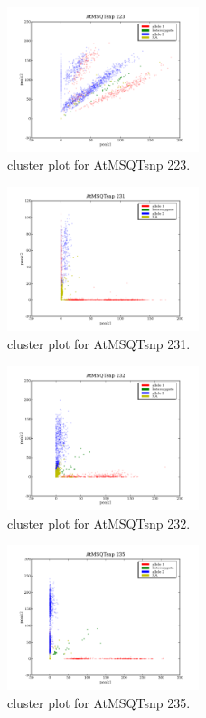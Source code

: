 \begin{figure}[H]
\includegraphics[width=0.5\textwidth]{figures/cluster_plot_AtMSQTsnp_223.png}
\caption{cluster plot for AtMSQTsnp 223.} \label{flAtMSQTsnp223}
\end{figure}
\begin{figure}[H]
\includegraphics[width=0.5\textwidth]{figures/cluster_plot_AtMSQTsnp_231.png}
\caption{cluster plot for AtMSQTsnp 231.} \label{flAtMSQTsnp231}
\end{figure}
\begin{figure}[H]
\includegraphics[width=0.5\textwidth]{figures/cluster_plot_AtMSQTsnp_232.png}
\caption{cluster plot for AtMSQTsnp 232.} \label{flAtMSQTsnp232}
\end{figure}
\begin{figure}[H]
\includegraphics[width=0.5\textwidth]{figures/cluster_plot_AtMSQTsnp_235.png}
\caption{cluster plot for AtMSQTsnp 235.} \label{flAtMSQTsnp235}
\end{figure}
